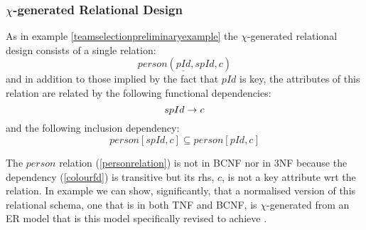 \subsubsection{$\chi$-generated Relational Design}
As in example \ref{teamselectionpreliminaryexample} the $\chi$-generated relational design consists of a single relation:
\begin{equation}
\label{personrelation}
person(\underline{pId}, spId, c)
\end{equation}
and in addition to those implied by the fact that $pId$ is key, the  attributes of this relation are related by the following  functional dependencies:
\begin{equation}
spId \rightarrow c
\end{equation}
and the following  inclusion dependency:
\begin{equation}
\label{spIdcolour1}
person[spId,c] \subseteq person[pId,c]
\end{equation}


The $person$ relation (\ref{personrelation}) is not in BCNF nor in 3NF because the dependency (\ref{colourfd}) is transitive but its rhs, $c$, is not a key attribute wrt the relation. 
In example  we can show, significantly,  that a normalised version of this relational schema, one that is in both TNF and BCNF, is 
$\chi$-generated from an ER model that is this  model specifically revised to achieve .



